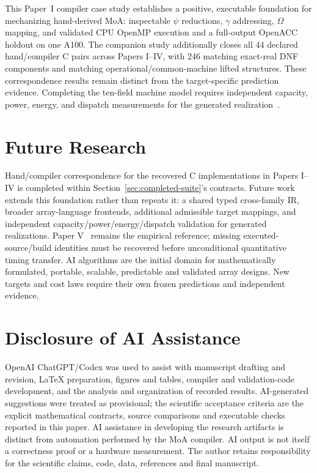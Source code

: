 \documentclass[sigplan,10pt,review,anonymous,balance=false,pbalance=false]{acmart}
\begin{document}
This Paper~I compiler case study establishes a positive, executable foundation for mechanizing hand-derived MoA: inspectable $\psi$ reductions, $\gamma$ addressing, $\Omega$ mapping, and validated CPU OpenMP execution and a full-output OpenACC holdout on one A100. The companion study additionally closes all 44 declared hand/compiler C pairs across Papers I--IV, with 246 matching exact-real DNF components and matching operational/common-machine lifted structures. These correspondence results remain distinct from the target-specific prediction evidence. Completing the ten-field machine model requires independent capacity, power, energy, and dispatch measurements for the generated realization~\cite{prediction,oneDerivation}.

\section{Future Research}
Hand/compiler correspondence for the recovered C implementations in Papers I--IV is completed within Section~\ref{sec:completed-suite}'s contracts. Future work extends this foundation rather than repeats it: a shared typed cross-family IR, broader array-language frontends, additional admissible target mappings, and independent capacity/power/energy/dispatch validation for generated realizations. Paper V~\cite{hardware} remains the empirical reference; missing executed-source/build identities must be recovered before unconditional quantitative timing transfer. AI algorithms are the initial domain for mathematically formulated, portable, scalable, predictable and validated array designs. New targets and cost laws require their own frozen predictions and independent evidence.


\section*{Disclosure of AI Assistance}
OpenAI ChatGPT/Codex was used to assist with manuscript drafting and revision, LaTeX preparation, figures and tables, compiler and validation-code development, and the analysis and organization of recorded results. AI-generated suggestions were treated as provisional; the scientific acceptance criteria are the explicit mathematical contracts, source comparisons and executable checks reported in this paper. AI assistance in developing the research artifacts is distinct from automation performed by the MoA compiler. AI output is not itself a correctness proof or a hardware measurement. The author retains responsibility for the scientific claims, code, data, references and final manuscript.


\end{document}
